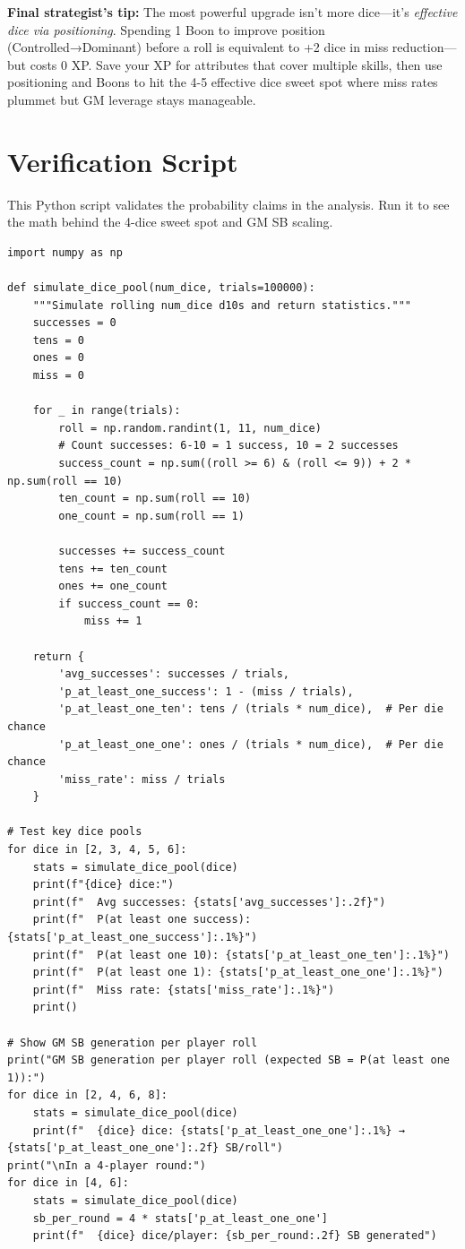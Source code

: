 \documentclass[11pt]{article}
\begin{document}
\textbf{Final strategist's tip:} 
The most powerful upgrade isn't more dice—it's \textit{effective dice via positioning}. Spending 1 Boon to improve position (Controlled→Dominant) before a roll is equivalent to +2 dice in miss reduction—but costs 0 XP. Save your XP for attributes that cover multiple skills, then use positioning and Boons to hit the 4-5 effective dice sweet spot where miss rates plummet but GM leverage stays manageable.

\appendix
\section{Verification Script}
This Python script validates the probability claims in the analysis. Run it to see the math behind the 4-dice sweet spot and GM SB scaling.

\begin{lstlisting}
import numpy as np

def simulate_dice_pool(num_dice, trials=100000):
    """Simulate rolling num_dice d10s and return statistics."""
    successes = 0
    tens = 0
    ones = 0
    miss = 0
    
    for _ in range(trials):
        roll = np.random.randint(1, 11, num_dice)
        # Count successes: 6-10 = 1 success, 10 = 2 successes
        success_count = np.sum((roll >= 6) & (roll <= 9)) + 2 * np.sum(roll == 10)
        ten_count = np.sum(roll == 10)
        one_count = np.sum(roll == 1)
        
        successes += success_count
        tens += ten_count
        ones += one_count
        if success_count == 0:
            miss += 1
    
    return {
        'avg_successes': successes / trials,
        'p_at_least_one_success': 1 - (miss / trials),
        'p_at_least_one_ten': tens / (trials * num_dice),  # Per die chance
        'p_at_least_one_one': ones / (trials * num_dice),  # Per die chance
        'miss_rate': miss / trials
    }

# Test key dice pools
for dice in [2, 3, 4, 5, 6]:
    stats = simulate_dice_pool(dice)
    print(f"{dice} dice:")
    print(f"  Avg successes: {stats['avg_successes']:.2f}")
    print(f"  P(at least one success): {stats['p_at_least_one_success']:.1%}")
    print(f"  P(at least one 10): {stats['p_at_least_one_ten']:.1%}")
    print(f"  P(at least one 1): {stats['p_at_least_one_one']:.1%}")
    print(f"  Miss rate: {stats['miss_rate']:.1%}")
    print()

# Show GM SB generation per player roll
print("GM SB generation per player roll (expected SB = P(at least one 1)):")
for dice in [2, 4, 6, 8]:
    stats = simulate_dice_pool(dice)
    print(f"  {dice} dice: {stats['p_at_least_one_one']:.1%} → {stats['p_at_least_one_one']:.2f} SB/roll")
print("\nIn a 4-player round:")
for dice in [4, 6]:
    stats = simulate_dice_pool(dice)
    sb_per_round = 4 * stats['p_at_least_one_one']
    print(f"  {dice} dice/player: {sb_per_round:.2f} SB generated")
\end{lstlisting}
\end{document}
